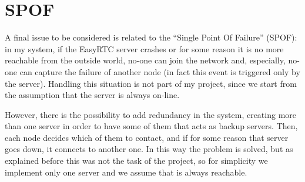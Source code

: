 \section{SPOF}
A final issue to be considered is related to the ``Single Point Of Failure'' (SPOF): in my system, if the EasyRTC server crashes or for some reason it is no more reachable from the outside world, no-one can join the network and, especially, no-one can capture the failure of another node (in fact this event is triggered only by the server). Handling this situation is not part of my project, since we start from the assumption that the server is always on-line.

However, there is the possibility to add redundancy in the system, creating more than one server in order to have some of them that acts as backup servers. Then, each node decides which of them to contact, and if for some reason that server goes down, it connects to another one. In this way the problem is solved, but as explained before this was not the task of the project, so for simplicity we implement only one server and we assume that is always reachable.
